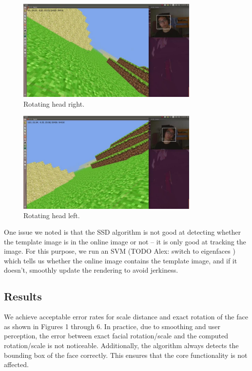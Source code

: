 \documentclass[10pt,twocolumn,letterpaper]{article}
\begin{document}
\begin{figure}[ht!]
\centering
\includegraphics[width=90mm]{rotation_left.jpg}
\caption{Rotating head right.\label{overflow}}
\end{figure}

\begin{figure}[ht!]
\centering
\includegraphics[width=90mm]{rotation_right.jpg}
\caption{Rotating head left.\label{overflow}}
\end{figure}

One issue we noted is that the SSD algorithm is not good at detecting whether the template
image is in the online image or not -- it is only good at tracking the image. For this
purpose, we run an SVM (TODO Alex: switch to eigenfaces \cite{eigenfaces}) which tells us whether the online image contains the template image,
and if it doesn't, smoothly update the rendering to avoid jerkiness.

\subsection*{Results}
We achieve acceptable error rates for scale distance and exact rotation of the face as shown in Figures 1 through 6. In practice, due to smoothing and user perception, the error between exact facial rotation/scale and the computed rotation/scale is not noticeable. Additionally, the algorithm always detects the bounding box of the face correctly. This ensures that the core functionality is not affected.
\end{document}
